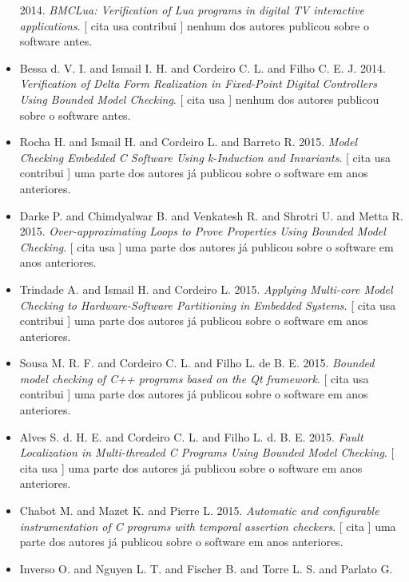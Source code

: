 \begin{itemize}
      2014.
        \textit{ BMCLua: Verification of Lua programs in digital TV interactive applications}.
      [
          cita
          usa
          contribui
      ]
nenhum dos autores publicou sobre o software antes.
\item Bessa d. V. I. and Ismail I. H. and Cordeiro C. L. and Filho C. E. J.
      2014.
        \textit{ Verification of Delta Form Realization in Fixed-Point Digital Controllers Using Bounded Model Checking}.
      [
          cita
          usa
      ]
nenhum dos autores publicou sobre o software antes.
\item Rocha H. and Ismail H. and Cordeiro L. and Barreto R.
      2015.
        \textit{ Model Checking Embedded C Software Using k-Induction and Invariants}.
      [
          cita
          usa
          contribui
      ]
uma parte dos autores já publicou sobre o software em anos anteriores.
\item Darke P. and Chimdyalwar B. and Venkatesh R. and Shrotri U. and Metta R.
      2015.
        \textit{ Over-approximating Loops to Prove Properties Using Bounded Model Checking}.
      [
          cita
          usa
      ]
uma parte dos autores já publicou sobre o software em anos anteriores.
\item Trindade A. and Ismail H. and Cordeiro L.
      2015.
        \textit{ Applying Multi-core Model Checking to Hardware-Software Partitioning in Embedded Systems}.
      [
          cita
          usa
          contribui
      ]
uma parte dos autores já publicou sobre o software em anos anteriores.
\item Sousa M. R. F. and Cordeiro C. L. and Filho L. de B. E.
      2015.
        \textit{ Bounded model checking of C++ programs based on the Qt framework}.
      [
          cita
          usa
          contribui
      ]
uma parte dos autores já publicou sobre o software em anos anteriores.
\item Alves S. d. H. E. and Cordeiro C. L. and Filho L. d. B. E.
      2015.
        \textit{ Fault Localization in Multi-threaded C Programs Using Bounded Model Checking}.
      [
          cita
          usa
      ]
uma parte dos autores já publicou sobre o software em anos anteriores.
\item Chabot M. and Mazet K. and Pierre L.
      2015.
        \textit{ Automatic and configurable instrumentation of C programs with temporal assertion checkers}.
      [
          cita
      ]
uma parte dos autores já publicou sobre o software em anos anteriores.
\item Inverso O. and Nguyen L. T. and Fischer B. and Torre L. S. and Parlato G.

\end{itemize}
